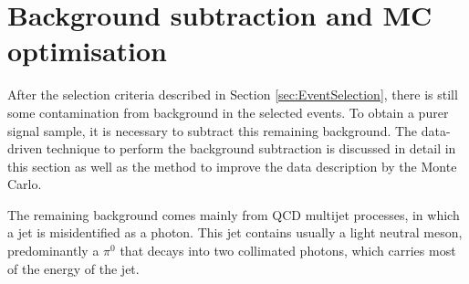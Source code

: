 \documentclass[12pt, twoside]{article}
\numberwithin{equation}{section}
\numberwithin{figure}{section}
\begin{document}
\section{Background subtraction and MC optimisation}
\label{sec:BackgroundSubtractionAndMCOptimisation}
\vspace{1.0cm}

After the selection criteria described in Section \ref{sec:EventSelection}, there is still some contamination from background in the selected events. To obtain a purer signal sample, it is necessary to subtract this remaining background. The data-driven technique to perform the background subtraction is discussed in detail in this section as well as the method to improve the data description by the Monte Carlo.

The remaining background comes mainly from QCD multijet processes, in which a jet is misidentified as a photon. This jet contains usually a light neutral meson, predominantly a $\pi^{0}$ that decays into two collimated photons, which carries most of the energy of the jet.
\end{document}
